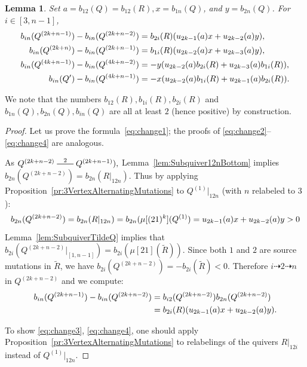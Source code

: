 \documentclass[11pt, letterpaper]{amsart}
\newtheorem{lemma}[theorem]{Lemma}
\theoremstyle{definition}
\numberwithin{equation}{section}
\newcommand{\T}[2]{\mu[#1](#2)} %
\newcommand{\mutation}[1]{\stackrel{#1}{\rule[.5ex]{2em}{0.5pt}}}
\newcommand{\points}{\!\dasharrow\!}
\begin{document}
\newcommand{\xv}{a}
\newcommand{\yv}{x}
\newcommand{\zv}{y}

\begin{lemma}
\label{lem:fourChanges}
Set $\xv\!=\!b_{12}(Q)\!=\!b_{12}(R), \yv\!=\!b_{1n}(Q)$, and $\zv\!=\!b_{2n}(Q)$. 
For $i\!\in\! [3,n-1]$,  
\begin{align}
    \label{eq:change1}
    b_{in}(Q^{(2k+n-1)}) - b_{in}(Q^{(2k+n-2)})  &= b_{2i}(R) (\h_{2k-1}(\xv) \yv + \h_{2k-2}(\xv) \zv), \\
    \label{eq:change2}
    b_{in}(Q^{(2k+n)}) - b_{in}(Q^{(2k+n-1)}) &= b_{1i}(R) (\h_{2k-2}(\xv) \yv + \h_{2k-3}(\xv) \zv), \\
    \label{eq:change3}
    b_{in}(Q^{(4k+n-1)}) - b_{in}(Q^{(4k+n-2)}) &= -\zv (\h_{2k-2}(\xv) b_{2i}(R) + \h_{2k-3}(\xv) b_{1i}(R)), \\
    \label{eq:change4}
    b_{in}(Q') - b_{in}(Q^{(4k+n-1)}) &= -\yv (\h_{2k-2}(\xv) b_{1i}(R) + \h_{2k-1}(\xv) b_{2i}(R)).
\end{align}
\end{lemma}

We note that the numbers $b_{12}(R), b_{1i}(R), b_{2i}(R)$ and $b_{1n}(Q), b_{2n}(Q), b_{in}(Q)$ 
are all at least $2$ (hence positive) by construction.

\begin{proof}
Let us prove the formula~\eqref{eq:change1}; 
the proofs of  \eqref{eq:change2}--
\eqref{eq:change4} are analogous.

As $Q^{(2k+n-2)} \mutation{2} Q^{(2k+n-1)}),$ Lemma~\ref{lem:Subquiver12nBottom} implies $b_{2n}(Q^{(2k+n-2)}) = b_{2n}(R|_{12n}).$ 
Thus by applying Proposition~\ref{pr:3VertexAlternatingMutations} to $Q^{(1)}|_{12n}$ (with $n$ relabeled to $3$):
\[
b_{2n}(Q^{(2k+n-2)}) =b_{2n}(R|_{12n}) = b_{2n}(\T{(21)^k}{Q^{(1)}} = \h_{2k-1}(\xv) \yv + \h_{2k-2}(\xv) \zv > 0
\]
Lemma~\ref{lem:SubquiverTildeQ} implies that $b_{2i}(Q^{(2k+n-2)}|_{[1,n-1]}) = b_{2i}(\T{21}{\tilde R}).$ 
Since both $1$ and $2$ are source mutations in $\tilde R$, we have 
$b_{2i}(Q^{(2k+n-2)}) = -b_{2i}(\tilde R) <0$.
%
Therefore $i \points 2 \points n$ in $Q^{(2k+n-2)}$ and we compute:
\begin{align*}
b_{in}(Q^{(2k+n-1)}) - b_{in}(Q^{(2k+n-2)}) &=b_{i2}(Q^{(2k+n-2)}) b_{2n}(Q^{(2k+n-2)}) \\
&=b_{2i}(R) (\h_{2k-1}(\xv) \yv + \h_{2k-2}(\xv) \zv).
\end{align*}

To show \eqref{eq:change3}, \eqref{eq:change4}, one should apply Proposition~\ref{pr:3VertexAlternatingMutations} to relabelings of the quivers $R|_{12i}$ instead of $Q^{(1)}|_{12n}$.
\end{proof}
\end{document}
